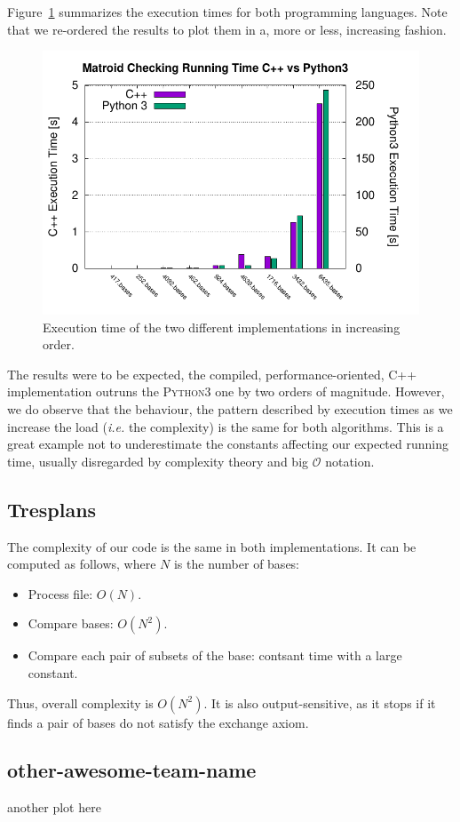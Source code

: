\documentclass[11pt]{amsart}
\begin{document}
Figure~\ref{fig:team-bearland-times} summarizes the execution times for both programming languages.
Note that we re-ordered the results to plot them in a, more or less, increasing fashion. 
\begin{figure}[h!]
    \centering
    \includegraphics[width=.7\textwidth]{./team-berland/exec_time.pdf}
    \caption{Execution time of the two different implementations in increasing order.\label{fig:team-bearland-times}}
\end{figure}
The results were to be expected, the compiled, performance-oriented, \textsc{C++} implementation outruns the \textsc{Python3} one by two orders of magnitude.
However, we do observe that the behaviour, the pattern described by execution times as we increase the load (\textit{i.e.} the complexity) is the same for both algorithms.
This is a great example not to underestimate the constants affecting our expected running time, usually disregarded by complexity theory and big $\mathcal{O}$ notation.

\subsection{Tresplans}

The complexity of our code is the same in both implementations.
It can be computed as follows, where $N$ is the number of bases:

\begin{itemize}
 \item Process file: $O(N)$.
 \item Compare bases: $O(N^2)$.
 \item Compare each pair of subsets of the base:
       contsant time with a large constant.
\end{itemize}

Thus, overall complexity is $O(N^2)$.
It is also output-sensitive,
as it stops if it finds a pair of bases do not satisfy the exchange axiom.

\subsection{other-awesome-team-name}

another plot here
\end{document}
